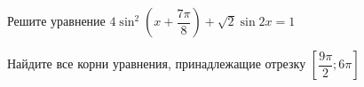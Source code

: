 \begin{ex}
	\begin{condition}
		\begin{enumcols}[label=\asbuk*)]
			\item Решите уравнение \(  4\sin^2{\left( x + \dfrac{7\pi}{8}\right)}+\sqrt{2}\sin 2x = 1 \)
			\item Найдите все корни уравнения, принадлежащие отрезку \( \left[\dfrac{9\pi}{2};6\pi\right] \)
		\end{enumcols}
	\end{condition}
\end{ex}